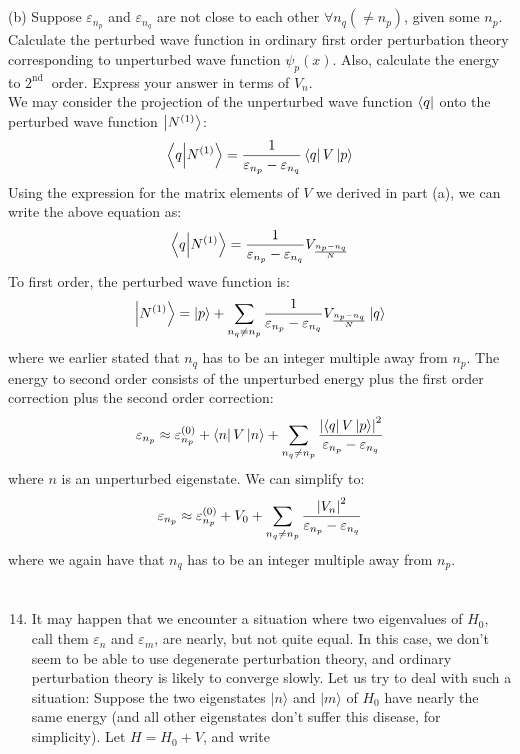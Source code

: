 \documentclass[12pt]{article}
\begin{document}
\subsection{}
(b) Suppose $\varepsilon_{n_{p}}$ and $\varepsilon_{n_{q}}$ are not close to each other $\forall n_{q}\left(\neq n_{p}\right)$, given some $n_{p}$. Calculate the perturbed wave function in ordinary first order perturbation theory corresponding to unperturbed wave function $\psi_{p}(x)$. Also, calculate the energy to $2^{\text {nd }}$ order. Express your answer in terms of $V_{n}$.\\
We may consider the projection of the unperturbed wave function $\bra{q}$ onto the perturbed wave function $\ket{N^{(1)}}$:
\begin{equation}
  \bra{q}\ket{N^{(1)}}=\frac{1}{\varepsilon _{n_{p}}-\varepsilon _{n_{q}}}\bra{q}V\ket{p}
\end{equation}
Using the expression for the matrix elements of $V$ we derived in part (a), we can write the above equation as:
\begin{equation}
  \bra{q}\ket{N^{(1)}}=\frac{1}{\varepsilon _{n_{p}}-\varepsilon _{n_{q}}}V_{\frac{n_{p}-n_{q}}{N}}
\end{equation}
To first order, the perturbed wave function is:
\begin{equation}
  \ket{N^{(1)}}=\ket{p}+\sum_{n_{q}\neq n_{p}}\frac{1}{\varepsilon _{n_{p}}-\varepsilon _{n_{q}}}V_{\frac{n_{p}-n_{q}}{N}}\ket{q}
\end{equation}
where we earlier stated that $n_{q}$ has to be an integer multiple away from $n_{p}$.
The energy to second order consists of the unperturbed energy plus the first order correction plus the second order correction:
\begin{equation}
  \varepsilon _{n_{p}}\approx\varepsilon _{n_{p}}^{(0)}+\bra{n}V\ket{n}+\sum_{n_{q}\neq n_{p}}\frac{\abs{\bra{q}V\ket{p}}^{2}}{\varepsilon _{n_{p}}-\varepsilon _{n_{q}}}
\end{equation}
where $n$ is an unperturbed eigenstate. We can simplify to:
\begin{equation}
  \varepsilon _{n_{p}}\approx\varepsilon _{n_{p}}^{(0)}+V_{0}+\sum_{n_{q}\neq n_{p}}\frac{\abs{V_n}^{2}}{\varepsilon _{n_{p}}-\varepsilon _{n_{q}}}
\end{equation}
where we again have that $n_{q}$ has to be an integer multiple away from $n_{p}$.
\section{}
\begin{enumerate}
  \setcounter{enumi}{13}
  \item It may happen that we encounter a situation where two eigenvalues of $H_{0}$, call them $\varepsilon_{n}$ and $\varepsilon_{m}$, are nearly, but not quite equal. In this case, we don't seem to be able to use degenerate perturbation theory, and ordinary perturbation theory is likely to converge slowly. Let us try to deal with such a situation: Suppose the two eigenstates $|n\rangle$ and $|m\rangle$ of $H_{0}$ have nearly the same energy (and all other eigenstates don't suffer this disease, for simplicity). Let $H=H_{0}+V$, and write
\end{enumerate}
\end{document}
